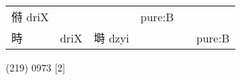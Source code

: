 \documentclass[14pt,a4paper]{scrartcl}
\begin{document}
\begin{longtable}[c]{@{}llllll@{}}
\begin{minipage}[t]{0.14\columnwidth}\raggedright\strut
偫 driX
\strut\end{minipage} &
\begin{minipage}[t]{0.14\columnwidth}\raggedright\strut
\strut\end{minipage} &
\begin{minipage}[t]{0.14\columnwidth}\raggedright\strut
\strut\end{minipage} &
\begin{minipage}[t]{0.14\columnwidth}\raggedright\strut
pure:B
\strut\end{minipage}\tabularnewline
\begin{minipage}[t]{0.14\columnwidth}\raggedright\strut
時
\strut\end{minipage} &
\begin{minipage}[t]{0.14\columnwidth}\raggedright\strut
driX
\strut\end{minipage} &
\begin{minipage}[t]{0.14\columnwidth}\raggedright\strut
塒 dzyi
\strut\end{minipage} &
\begin{minipage}[t]{0.14\columnwidth}\raggedright\strut
\strut\end{minipage} &
\begin{minipage}[t]{0.14\columnwidth}\raggedright\strut
\strut\end{minipage} &
\begin{minipage}[t]{0.14\columnwidth}\raggedright\strut
pure:B
\strut\end{minipage}\tabularnewline
\bottomrule
\end{longtable}

(219) 0973 {[}2{]}
\end{document}
